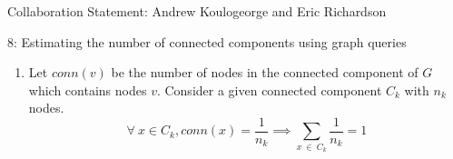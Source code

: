 \documentclass[12pt]{article}
\begin{document}

Collaboration Statement: Andrew Koulogeorge and Eric Richardson 

\begin{problem}{8: Estimating the number of connected components using graph queries}
\end{problem}

\begin{solution}
\begin{enumerate}[label=(\alph*)]
    \item Let $conn(v)$ be the number of nodes in the connected component of $G$ which contains nodes $v$. Consider a given connected component $C_k$ with $n_k$ nodes. 
\[
    \forall~x\in C_k, conn(x)=\frac{1}{n_k} \implies \sum_{x~\in~C_k}{\frac{1}{n_k}} = 1
\]
    

\end{enumerate}
\end{solution}
\end{document}
